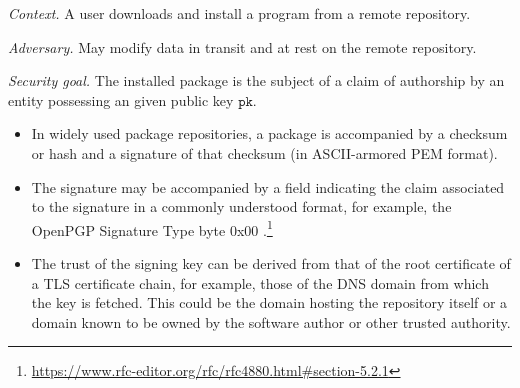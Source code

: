 \emph{Context.} A user downloads and install a program from a remote
repository.

\emph{Adversary.} May modify data in transit and at rest on the remote
repository.

\emph{Security goal.} The installed package is the subject of a claim of
authorship by an entity possessing an given public key \(\mathtt{pk}\).

\begin{itemize}
\tightlist
\item
  In widely used package repositories, a package is accompanied by a checksum or hash and a signature of that checksum (in ASCII-armored PEM format).
\item
  The signature may be accompanied by a field indicating the claim associated to the signature in a commonly understood format, for example, the OpenPGP Signature Type byte 0x00 \cite[\S5.2.1]{rfc4880}.\footnote{\url{https://www.rfc-editor.org/rfc/rfc4880.html\#section-5.2.1}}
\item
  The trust of the signing key can be derived from that of the root
  certificate of a TLS certificate chain, for example, those of the DNS
  domain from which the key is fetched. This could be the domain hosting
  the repository itself or a domain known to be owned by the software
  author or other trusted authority.
\end{itemize}

\printbibliography